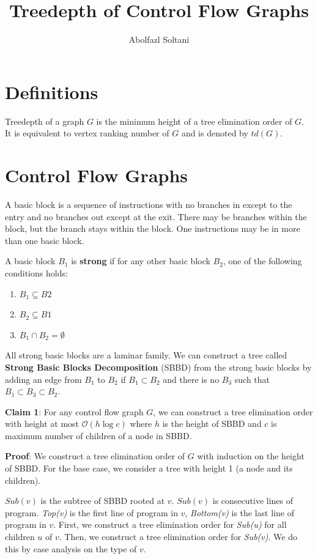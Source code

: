 \documentclass[a4paper,11.5pt,oneside]{article}
\begin{document}
\title{Treedepth of Control Flow Graphs}
\author{Abolfazl Soltani}
\date{}
\maketitle

\section{Definitions}

Treedepth of a graph $G$ is the minimum height of a tree elimination order of $G$.
It is equivalent to vertex ranking number of $G$ and is denoted by $td(G)$.

\section{Control Flow Graphs}


A basic block is a sequence of instructions with no branches in except to the entry and no branches out except at the exit.
There may be branches within the block, but the branch stays within the block.
One instructions may be in more than one basic block.

A basic block $B_1$ is \textbf{strong} if for any other basic block $B_2$, one of the following conditions holds:
\begin{enumerate}
    \item $B_1 \subseteq B2$
    \item $B_2 \subseteq B1$
    \item $B_1 \cap B_2 = \emptyset$
\end{enumerate}

All strong basic blocks are a laminar family. 
We can construct a tree called \textbf{Strong Basic Blocks Decomposition} (SBBD) from the strong basic blocks 
by adding an edge from $B_1$ to $B_2$ if $B_1 \subset B_2$ and 
there is no $B_3$ such that $B_1 \subset B_3 \subset B_2$. 

\textbf{Claim 1}: For any control flow graph $G$, 
we can construct a tree elimination order with height at most 
$\mathcal{O}(h \log c)$ where $h$ is the height of SBBD and $c$ is maximum number of children of a node in SBBD.

\textbf{Proof}: We construct a tree elimination order of $G$ with induction on the height of SBBD.
For the base case, we consider a tree with height 1 (a node and its children).

$Sub(v)$ is the subtree of SBBD rooted at $v$. $Sub(v)$ is consecutive lines of program.
\textit{Top(v)} is the first line of program in $v$, 
\textit{Bottom(v)} is the last line of program in $v$.
First, we construct a tree elimination order for \textit{Sub(u)} for all children $u$ of $v$.
Then, we construct a tree elimination order for \textit{Sub(v)}. We do this by case analysis on the type of $v$.
\end{document}
